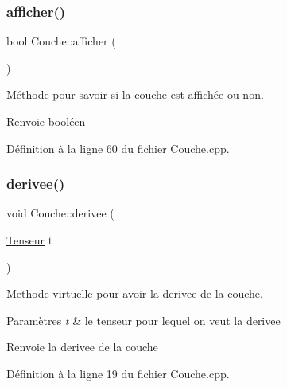 \subsubsection{\texorpdfstring{afficher()}{afficher()}}
{\footnotesize\ttfamily bool Couche\+::afficher (\begin{DoxyParamCaption}{ }\end{DoxyParamCaption})\hspace{0.3cm}{\ttfamily [virtual]}}



Méthode pour savoir si la couche est affichée ou non. 

\begin{DoxyReturn}{Renvoie}
booléen 
\end{DoxyReturn}


Définition à la ligne 60 du fichier Couche.\+cpp.

\mbox{\label{class_couche_acfb65d035c2070d65b699508b7333bb3}} 
\subsubsection{\texorpdfstring{derivee()}{derivee()}}
{\footnotesize\ttfamily void Couche\+::derivee (\begin{DoxyParamCaption}\item[{\hyperlink{class_tenseur}{Tenseur}}]{t }\end{DoxyParamCaption})\hspace{0.3cm}{\ttfamily [virtual]}}



Methode virtuelle pour avoir la derivee de la couche. 


\begin{DoxyParams}{Paramètres}
{\em t} & le tenseur pour lequel on veut la derivee \\
\hline
\end{DoxyParams}
\begin{DoxyReturn}{Renvoie}
la derivee de la couche 
\end{DoxyReturn}


Définition à la ligne 19 du fichier Couche.\+cpp.

\mbox{\label{class_couche_a4f3e4fe4a84f2dfcbee4bda6e20bdc03}} 
